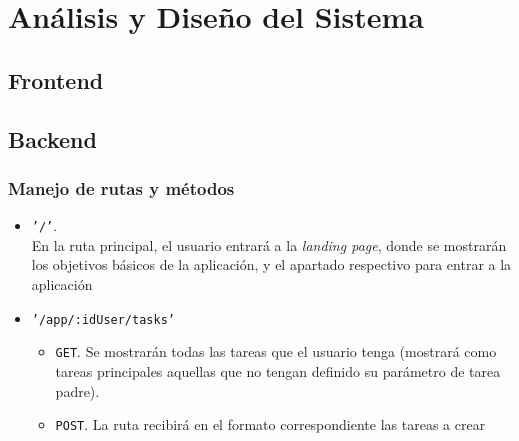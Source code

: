 \chapter{Análisis y Diseño del Sistema}	

\section{Frontend}

\section{Backend}

\subsection{Manejo de rutas y m\'etodos}

\begin{itemize}
  \item \texttt{'/'}.\\
    En la ruta principal, el usuario entrar\'a a la \textit{landing page}, donde se mostrar\'an los objetivos b\'asicos de la aplicaci\'on, y el apartado respectivo para entrar a la aplicaci\'on
  \item \texttt{'/app/:idUser/tasks'}
    \begin{itemize}
      \item \texttt{GET}. Se mostrar\'an todas las tareas que el usuario tenga (mostrar\'a como tareas principales aquellas que no tengan definido su par\'ametro de tarea padre).
      \item \texttt{POST}. La ruta recibir\'a en el formato correspondiente las tareas a crear
    \end{itemize}
\end{itemize}
